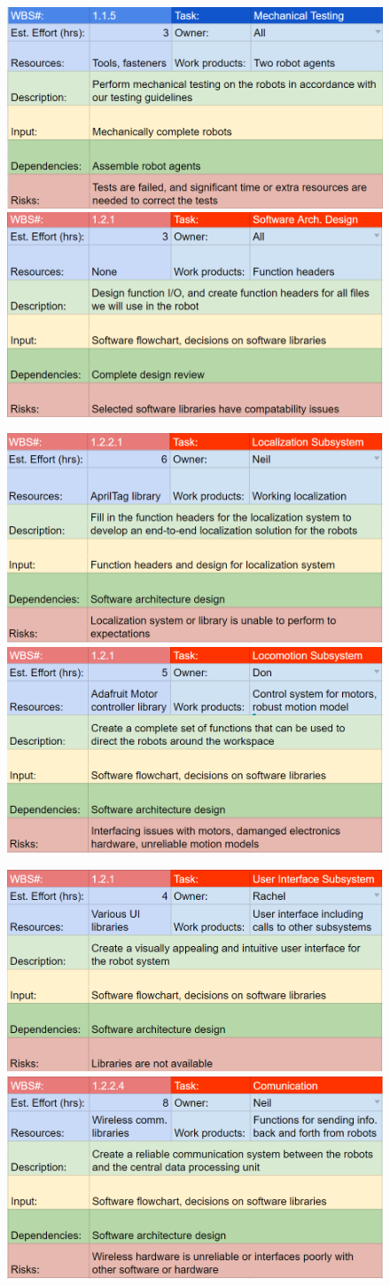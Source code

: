 \begin{figure}[h!]
\centering
\includegraphics[width=0.49\columnwidth]{wbs_schedule/wbs_dict_hw7.PNG}
\includegraphics[width=0.49\columnwidth]{wbs_schedule/wbs_dict_sw1.PNG}
\label{fig:hw7sw1}
\end{figure}
\begin{figure}[h!]
\centering
\includegraphics[width=0.49\columnwidth]{wbs_schedule/wbs_dict_sw2.PNG}
\includegraphics[width=0.49\columnwidth]{wbs_schedule/wbs_dict_sw3.PNG}
\label{fig:sw2sw3}
\end{figure}
\begin{figure}[h!]
\centering
\includegraphics[width=0.49\columnwidth]{wbs_schedule/wbs_dict_sw4.PNG}
\includegraphics[width=0.49\columnwidth]{wbs_schedule/wbs_dict_sw5.PNG}
\label{fig:sw4sw5}
\end{figure}

